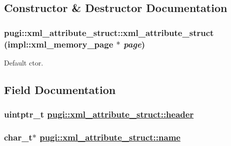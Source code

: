 \subsection{Constructor \& Destructor Documentation}
\hypertarget{structpugi_1_1xml__attribute__struct_57bb21cb72613e746a659efdd6425b94}{
\subsubsection[xml\_\-attribute\_\-struct]{\setlength{\rightskip}{0pt plus 5cm}pugi::xml\_\-attribute\_\-struct::xml\_\-attribute\_\-struct (impl::xml\_\-memory\_\-page $\ast$ {\em page})}}
\label{structpugi_1_1xml__attribute__struct_57bb21cb72613e746a659efdd6425b94}


Default ctor. 



\subsection{Field Documentation}
\hypertarget{structpugi_1_1xml__attribute__struct_0dca6ca6c129bbf87a7ebaf87f3e12de}{
\subsubsection[header]{\setlength{\rightskip}{0pt plus 5cm}uintptr\_\-t \hyperlink{structpugi_1_1xml__attribute__struct_0dca6ca6c129bbf87a7ebaf87f3e12de}{pugi::xml\_\-attribute\_\-struct::header}}}
\label{structpugi_1_1xml__attribute__struct_0dca6ca6c129bbf87a7ebaf87f3e12de}


\hypertarget{structpugi_1_1xml__attribute__struct_a886c4aae23a132e1704717721ee2c19}{
\subsubsection[name]{\setlength{\rightskip}{0pt plus 5cm}char\_\-t$\ast$ \hyperlink{structpugi_1_1xml__attribute__struct_a886c4aae23a132e1704717721ee2c19}{pugi::xml\_\-attribute\_\-struct::name}}}
\label{structpugi_1_1xml__attribute__struct_a886c4aae23a132e1704717721ee2c19}


